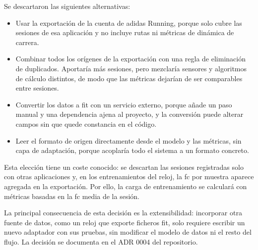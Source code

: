 Se descartaron las siguientes alternativas:

\begin{itemize}
    \item Usar la exportación de la cuenta de adidas Running, porque solo cubre las sesiones de esa aplicación y no incluye rutas ni métricas de dinámica de carrera.
    \item Combinar todos los orígenes de la exportación con una regla de eliminación de duplicados. Aportaría más sesiones, pero mezclaría sensores y algoritmos de cálculo distintos, de modo que las métricas dejarían de ser comparables entre sesiones.
    \item Convertir los datos a \gls{fit} con un servicio externo, porque añade un paso manual y una dependencia ajena al proyecto, y la conversión puede alterar campos sin que quede constancia en el código.
    \item Leer el formato de origen directamente desde el modelo y las métricas, sin capa de adaptación, porque acoplaría todo el sistema a un formato concreto.
\end{itemize}

Esta elección tiene un coste conocido: se descartan las sesiones registradas solo con otras aplicaciones y, en los entrenamientos del reloj, la \gls{fc} por muestra aparece agregada en la exportación. Por ello, la carga de entrenamiento se calculará con métricas basadas en la \gls{fc} media de la sesión.

La principal consecuencia de esta decisión es la extensibilidad: incorporar otra fuente de datos, como un reloj que exporte ficheros \gls{fit}, solo requiere escribir un nuevo adaptador con sus pruebas, sin modificar el modelo de datos ni el resto del flujo. La decisión se documenta en el ADR 0004 del repositorio.

